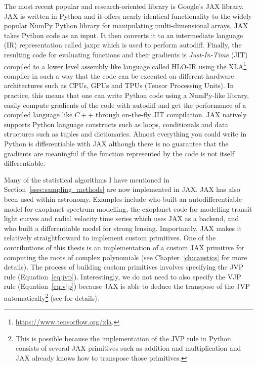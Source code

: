 \documentclass[12pt,dvipsnames]{report}
\newcommand{\ssf}[1]{\textsf{#1}}
\begin{document}
The most recent popular and research-oriented library is Google's \ssf{JAX} library.
\ssf{JAX} is written in \ssf{Python} and it offers nearly identical functionality 
to the widely popular \ssf{NumPy} \ssf{Python} library for manipulating 
multi-dimensional arrays. \ssf{JAX} takes Python code as an input. It then converts it 
to an intermediate language (IR) representation called \ssf{jaxpr} which is 
used to perform autodiff. Finally, the resulting code for evaluating functions 
and their gradients is \emph{Just-In-Time} (JIT) compiled to a lower level 
assembly like language called \ssf{HLO-IR} using the 
\ssf{XLA}\footnote{\url{https://www.tensorflow.org/xla}.} compiler in such a way 
that the code can be executed on different hardware architectures such  as 
CPUs, GPUs and TPUs (Tensor Processing Units).
In practice, this means that one can write \ssf{Python} code using a \ssf{NumPy}-like 
library, easily compute gradients of the code with autodiff and get 
the performance of a compiled language like $C++$ through on-the-fly JIT 
compilation. \ssf{JAX} natively supports \ssf{Python} language constructs such 
as loops, conditionals and data structures such as tuples and dictionaries.
Almost everything you could write in \ssf{Python} is differentiable with 
\ssf{JAX} although there is no guarantee that the gradients are meaningful 
if the function represented by the code is not itself differentiable.

Many of the statistical algorithms I have mentioned  in 
Section~\ref{ssec:sampling_methods} are now implemented in \ssf{JAX}. 
\ssf{JAX} has also been used within astronomy. Examples include 
\citet{2022ApJS..258...31K} who built 
an autodifferentiable model for exoplanet spectrum modelling, 
the \ssf{exoplanet} code \citet{2021JOSS....6.3285F} for modelling transit light 
curves and radial velocity time series which uses \ssf{JAX} as a backend, and 
\citet{2022arXiv220207663G} who built a differentiable model 
for strong lensing. Importantly, \ssf{JAX} makes it relatively 
straightforward to implement custom primitives. One of the contributions of this 
thesis is an implementation of a custom JAX primitive for computing the roots 
of complex polynomials (see Chapter~\ref{ch:caustics} for more details).
The process of building custom primitives involves specifying the JVP rule 
(Equation~\ref{eq:jvp}). Interestingly, we do not need to also specify the VJP 
rule (Equation~\ref{eq:vjp}) because 
\ssf{JAX} is able to deduce the transpose of the JVP automatically\footnote{
    This is possible because the implementation of the JVP rule 
    in \ssf{Python} consists of several \ssf{JAX} primitives such as addition
    and multiplication and \ssf{JAX} already knows how to transpose those 
    primitives.} (see \citet{arXiv:2105.09469} for details). 
\end{document}
